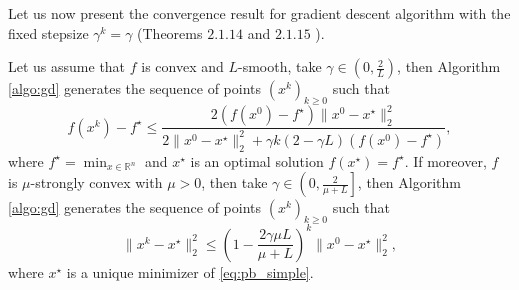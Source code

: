 Let us now present the convergence result for  gradient descent algorithm with the fixed stepsize $\gamma^k = \gamma$ (Theorems $2.1.14$ and $2.1.15$ \cite{nesterov-book}).
\begin{theorem}\label{th:gd}
Let us assume that $f$ is convex and $L$-smooth, take $\gamma\in\left(0,\frac{2}{L}\right)$, then Algorithm \ref{algo:gd} generates the sequence of points $(x^k)_{k\geq0}$ such that 
\begin{equation}
    f(x^k) - f^\star \leq \frac{2(f(x^0)-f^\star)\|x^0-x^\star\|_2^2}{2\|x^0-x^\star\|_2^2 + \gamma k(2-\gamma L)(f(x^0) - f^\star)},
\end{equation}
where $f^\star = \min_{x\in\mathbb{R}^n}$ and $x^\star$ is an optimal solution $f(x^\star) = f^\star$.
If moreover, $f$ is $\mu$-strongly convex with $\mu>0$, then take $\gamma\in\left(0, \frac{2}{\mu + L}\right]$, then Algorithm \ref{algo:gd} generates the sequence of points $(x^k)_{k\geq0}$ such that 
\begin{equation}
\|x^k-x^\star\|_2^2\leq\left(1-\frac{2\gamma\mu L}{\mu + L}\right)^k\|x^0-x^\star\|_2^2,
\end{equation}
where $x^\star$ is a unique minimizer of \eqref{eq:pb_simple}.
\end{theorem}



